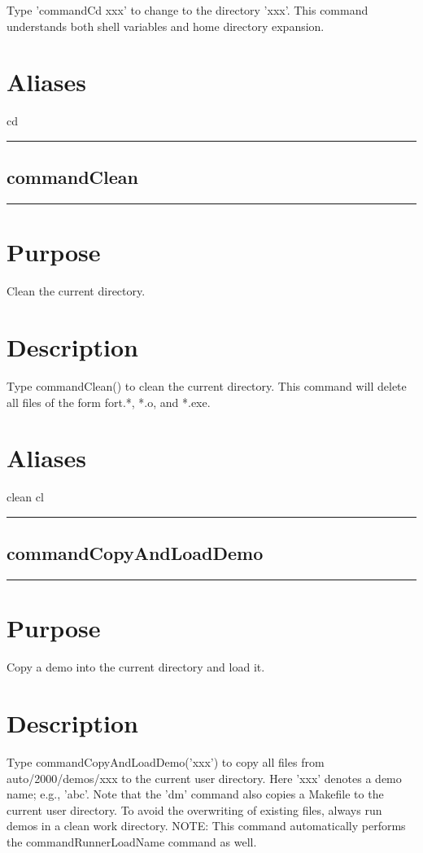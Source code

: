 \documentclass[12pt]{report}
\begin{document}
\begin{minipage}{6in}
    Type 'commandCd xxx' to change to the directory 'xxx'.  This command
    understands both shell variables and home directory expansion.
    \section*{Aliases}
cd \medskip\hrule\end{minipage}\subsection{commandClean} \label{sec:clui_ref_commandClean}\begin{minipage}{6in}\hrule\medskip\section*{Purpose}
Clean the current directory.\section*{Description}

    Type commandClean() to clean the current directory.  This command will
    delete all files of the form fort.*, *.o, and *.exe.
    \section*{Aliases}
clean cl \medskip\hrule\end{minipage}\subsection{commandCopyAndLoadDemo} \label{sec:clui_ref_commandCopyAndLoadDemo}\begin{minipage}{6in}\hrule\medskip\section*{Purpose}
Copy a demo into the current directory and load it.\section*{Description}

    Type commandCopyAndLoadDemo('xxx') to copy all files from auto/2000/demos/xxx to the
    current user directory.  Here 'xxx' denotes a demo name; e.g.,
    'abc'.  Note that the 'dm' command also copies a Makefile to the
    current user directory. To avoid the overwriting of existing
    files, always run demos in a clean work directory.  NOTE: This
    command automatically performs the commandRunnerLoadName command
    as well.

\end{minipage}
\end{document}

